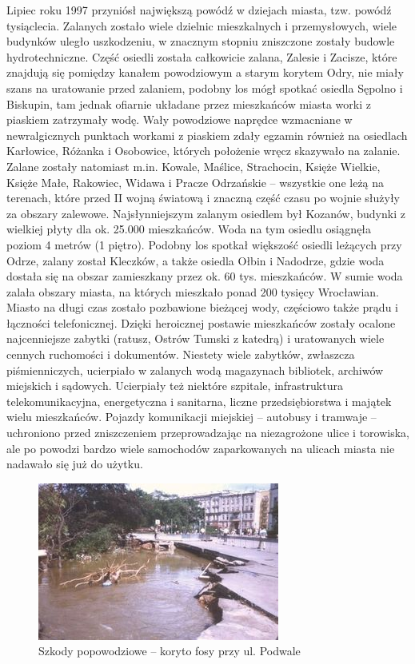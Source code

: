\documentclass{article}
\begin{document}
Lipiec roku 1997 przyniósł największą powódź w dziejach miasta, tzw. powódź tysiąclecia. Zalanych zostało wiele dzielnic mieszkalnych i przemysłowych, wiele budynków uległo uszkodzeniu, w znacznym stopniu zniszczone zostały budowle hydrotechniczne. Część osiedli została całkowicie zalana, Zalesie i Zacisze, które znajdują się pomiędzy kanałem powodziowym a starym korytem Odry, nie miały szans na uratowanie przed zalaniem, podobny los mógł spotkać osiedla Sępolno i Biskupin, tam jednak ofiarnie układane przez mieszkańców miasta worki z piaskiem zatrzymały wodę. Wały powodziowe naprędce wzmacniane w newralgicznych punktach workami z piaskiem zdały egzamin również na osiedlach Karłowice, Różanka i Osobowice, których położenie wręcz skazywało na zalanie. Zalane zostały natomiast m.in. Kowale, Maślice, Strachocin, Księże Wielkie, Księże Małe, Rakowiec, Widawa i Pracze Odrzańskie – wszystkie one leżą na terenach, które przed II wojną światową i znaczną część czasu po wojnie służyły za obszary zalewowe. Najsłynniejszym zalanym osiedlem był Kozanów, budynki z wielkiej płyty dla ok. 25.000 mieszkańców. Woda na tym osiedlu osiągnęła poziom 4 metrów (1 piętro). Podobny los spotkał większość osiedli leżących przy Odrze, zalany został Kleczków, a także osiedla Ołbin i Nadodrze, gdzie woda dostała się na obszar zamieszkany przez ok. 60 tys. mieszkańców. W sumie woda zalała obszary miasta, na których mieszkało ponad 200 tysięcy Wrocławian. Miasto na długi czas zostało pozbawione bieżącej wody, częściowo także prądu i łączności telefonicznej. Dzięki heroicznej postawie mieszkańców zostały ocalone najcenniejsze zabytki (ratusz, Ostrów Tumski z katedrą) i uratowanych wiele cennych ruchomości i dokumentów. Niestety wiele zabytków, zwłaszcza piśmienniczych, ucierpiało w zalanych wodą magazynach bibliotek, archiwów miejskich i sądowych. Ucierpiały też niektóre szpitale, infrastruktura telekomunikacyjna, energetyczna i sanitarna, liczne przedsiębiorstwa i majątek wielu mieszkańców. Pojazdy komunikacji miejskiej – autobusy i tramwaje – uchroniono przed zniszczeniem przeprowadzając na niezagrożone ulice i torowiska, ale po powodzi bardzo wiele samochodów zaparkowanych na ulicach miasta nie nadawało się już do użytku.

\begin{figure}[htbp!]
\centering
\includegraphics[scale=3.0]{19.jpg}
\caption{Szkody popowodziowe – koryto fosy przy ul. Podwale}
\label{fig:17}
\end{figure}
\end{document}
